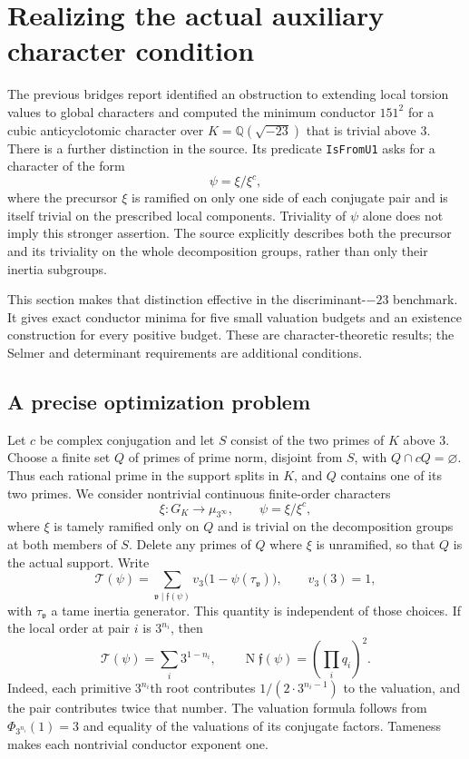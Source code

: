 \section{Realizing the actual auxiliary character condition}
\label{sec:source_twists}

The previous bridges report identified an obstruction to extending local
torsion values to global characters and computed the minimum conductor
$151^2$ for a cubic anticyclotomic character over
$K=\mathbb Q(\sqrt{-23})$ that is trivial above $3$.
\cite{prior-bridges}
There is a further distinction in the source.  Its predicate
\texttt{IsFromU1} asks for a character of the form
\[
                 \psi=\xi/\xi^c,
\]
where the precursor $\xi$ is ramified on only one side of each conjugate
pair and is itself trivial on the prescribed local components.
Triviality of $\psi$ alone does not imply this stronger assertion.
The source explicitly describes both the precursor and its triviality on
the whole decomposition groups, rather than only their inertia subgroups.
\cite{sourceCMSplit,sourceAuxPrimes}

This section makes that distinction effective in the discriminant-$-23$
benchmark.  It gives exact conductor minima for five small valuation
budgets and an existence construction for every positive budget.
These are character-theoretic results; the Selmer and determinant
requirements are additional conditions.

\subsection{A precise optimization problem}

Let $c$ be complex conjugation and let $S$ consist of the two primes of
$K$ above $3$.  Choose a finite set $Q$ of primes of prime norm, disjoint
from $S$, with $Q\cap cQ=\varnothing$.  Thus each rational prime in the
support splits in $K$, and $Q$ contains one of its two primes.
We consider nontrivial continuous finite-order characters
\[
  \xi:G_K\longrightarrow\mu_{3^\infty},\qquad
  \psi=\xi/\xi^c,
\]
where $\xi$ is tamely ramified only on $Q$ and is trivial on the
decomposition groups at both members of $S$.  Delete any primes of $Q$
where $\xi$ is unramified, so that $Q$ is the actual support.
Write
\[
  \mathcal T(\psi)=
  \sum_{\mathfrak v\mid\mathfrak f(\psi)}
       v_3\bigl(1-\psi(\tau_{\mathfrak v})\bigr),
       \qquad v_3(3)=1,
\]
with $\tau_{\mathfrak v}$ a tame inertia generator.  This quantity is
independent of those choices.  If the local order at pair $i$ is
$3^{n_i}$, then
\begin{equation}\label{eq:source_twist_cost}
 \mathcal T(\psi)=\sum_i3^{1-n_i},\qquad
 \operatorname N\mathfrak f(\psi)=\left(\prod_iq_i\right)^2.
\end{equation}
Indeed, each primitive $3^{n_i}$th root contributes
$1/(2\cdot3^{n_i-1})$ to the valuation, and the pair contributes twice
that number.  The valuation formula follows from
$\Phi_{3^{n_i}}(1)=3$ and equality of the valuations of its conjugate
factors.  Tameness makes each nontrivial conductor exponent one.

